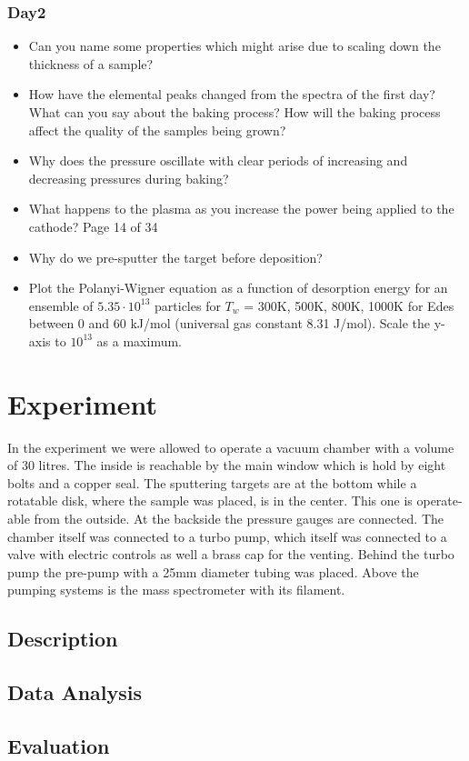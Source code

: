 \documentclass[]{article}
\begin{document}
\subsubsection{Day2}
\begin{itemize}
	 \item Can you name some properties which might arise due to scaling down the thickness of a sample? \item How have the elemental peaks changed from the spectra of the ﬁrst day? What can you say about the baking process? How will the baking process affect the quality of the samples being grown? \item Why does the pressure oscillate with clear periods of increasing and decreasing pressures during baking? \item What happens to the plasma as you increase the power being applied to the cathode?
	Page 14 of 34
	\item Why do we pre-sputter the target before deposition? \item  Plot the Polanyi-Wigner equation as a function of desorption energy for an ensemble of $5.35 \cdot 10^{13}$ particles for $T_w$ = 300K, 500K, 800K, 1000K for Edes between 0 and 60 kJ/mol (universal gas constant 8.31 J/mol). Scale the y-axis to $10^{13}$ as a maximum.
	
\end{itemize}
\section{Experiment}
In the experiment we were allowed to operate a vacuum chamber with a volume of 30 litres. The inside is reachable by the main window which is hold by eight bolts and a copper seal. The sputtering targets are at the bottom while a rotatable disk, where the sample was placed, is in the center. This one is operate-able from the outside. At the backside the pressure gauges are connected. 
The chamber itself was connected to a turbo pump, which itself was connected to a valve with electric controls as well a brass cap for the venting. Behind the turbo pump the pre-pump with a 25mm diameter tubing was placed. Above the pumping systems is the mass spectrometer with its filament.

\subsection{Description}
\subsection{Data Analysis}
\subsection{Evaluation}
\end{document}
